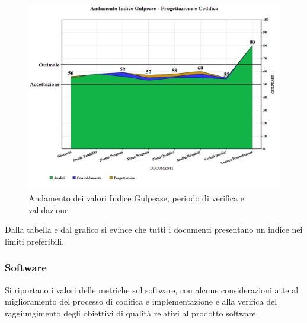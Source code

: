 \documentclass[openany,12pt,a4paper]{report}
\begin{document}
\begin{itemize}
	\begin{figure}[H]
		\includegraphics[scale=0.5]{verifica-progettazione-gulpease}
		\centering
		\caption{Andamento dei valori Indice Gulpease, periodo di verifica e validazione}
	\end{figure}
	
	Dalla tabella e dal grafico si evince che tutti i documenti presentano un indice nei limiti preferibili.	
\end{itemize}

\subsubsection{Software}

Si riportano i valori delle metriche sul software, con alcune considerazioni atte al miglioramento del processo di codifica e implementazione e alla verifica del raggiungimento degli obiettivi di qualità relativi al prodotto software.
\end{document}
